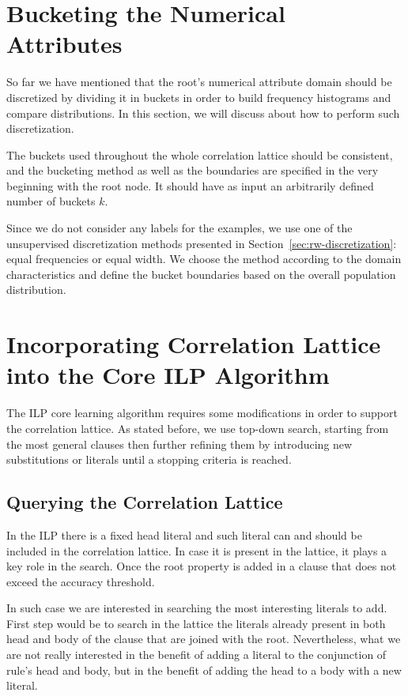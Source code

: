 \section{Bucketing the Numerical Attributes}

So far we have mentioned that the root's numerical attribute domain should be discretized by dividing it in buckets in
order to build frequency histograms and compare distributions. In this section, we will discuss about how to perform
such discretization.

The buckets used throughout the whole correlation lattice should be consistent, and the bucketing method as well as
the
boundaries are specified in the very beginning with the root node. It should have as input an arbitrarily defined
number
of buckets $k$.

Since we do not consider any labels for the examples, we use one of the unsupervised discretization methods presented
in Section~\ref{sec:rw-discretization}: equal frequencies or equal width. We choose the method according to the domain
characteristics and define the bucket boundaries based on the overall population distribution.

\section{Incorporating Correlation Lattice into the Core ILP Algorithm}
\label{sec:incorporation}

The ILP core learning algorithm requires some modifications in order to support the correlation lattice. As stated
before, we use top-down search, starting from the most general clauses then further refining them by introducing
new substitutions or literals until a stopping criteria is reached.

\subsection{Querying the Correlation Lattice}
\label{sec:queryingTheLattice}

In the ILP there is a fixed head literal and such literal can and should be included in the correlation lattice. In
case it is present in the lattice, it plays a key role in the search. Once the root property is added in a clause that
does not exceed the accuracy threshold.

In such case we are interested in searching the most interesting literals to add. First step would be to search in the
lattice the literals already present in both head and body of the clause that are joined with the root. Nevertheless,
what we are not really interested in the benefit of adding a literal to the conjunction of rule's head and body, but
in
the benefit of adding the head to a body with a new literal.


